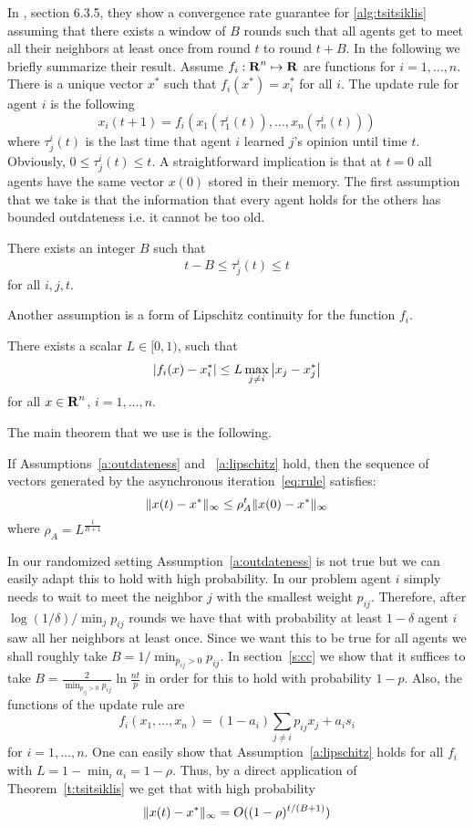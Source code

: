 In \cite{BT97}, section 6.3.5, they show a convergence rate guarantee for
\ref{alg:tsitsiklis} assuming that there exists
a window of $B$ rounds such that all agents get to meet all their
neighbors at least once from round $t$ to round $t+B$.
In the  following we briefly summarize their result. 
Assume $f_i:\bm{\mathrm{R}}^n \mapsto \bm{\mathrm{R}}$ are functions for $i = 1,\ldots,n$. There is 
a unique vector $x^*$ such that $f_i(x^*) = x_i^*$ for all $i$. 
The update rule for agent $i$ is the following
\begin{equation}\label{eq:rule}
x_i(t+1) = f_i(x_1(\tau_1^i(t)),\ldots, x_n(\tau_n^i(t)))
\end{equation}
where $\tau_j^i(t)$ is the last time that agent $i$
learned $j$'s opinion until time $t$. Obviously, $0\leq \tau_j^i(t) \leq t$.
A straightforward implication is that at $t =0$ all agents have the same 
vector $x(0)$ stored in their memory. 
The first assumption that we take is that the information that every agent
holds for the others has bounded outdateness i.e. it cannot be too old. 
\begin{assumption}\label{a:outdateness}
There exists an integer $B$ such that 
\[
t-B \leq \tau_j^i(t) \leq t
\]
for all $i,j,t$.
\end{assumption}
Another assumption is a form of Lipschitz continuity for the function $f_i$.
\begin{assumption}\label{a:lipschitz}
There exists a scalar $L \in [0,1)$, such that 
\[
\left|f_i(x) - x_i^*\right| \leq L \max_{j \neq i}\left|x_j - x_j^*\right|
\]
for all $x \in \bm{\mathrm{R}}^n$, $i = 1,\ldots, n$.
\end{assumption}
The main theorem that we use is the following. 
\begin{theorem}[{{\cite{BT97}}}]\label{t:tsitsiklis}
If Assumptions~\ref{a:outdateness} and ~\ref{a:lipschitz} hold, 
then the sequence of vectors generated 
by the asynchronous iteration~\ref{eq:rule} satisfies:
\[
\| x(t) - x^* \|_{\infty} \leq \rho_A^t\| x(0) - x^* \|_{\infty}
\]
where $\rho_A = L^{\frac{1}{B+1}}$
\end{theorem}
In our randomized setting Assumption~\ref{a:outdateness} is not true 
but we can easily adapt this to
hold with high probability. In our problem
agent $i$ simply needs to wait to meet the neighbor $j$ with the smallest
weight $p_{ij}$. Therefore, after $\log(1/\delta)/\min_{j} p_{ij}$ rounds
we have that with probability at least $1-\delta$ agent $i$ saw all her
neighbors at least once. Since we want this to be true for all agents
we shall roughly take $B = 1/\min_{p_{ij} > 0} {p_{ij}}$.
In section~\ref{s:cc} we show that it suffices to take 
$B = \frac{2}{\min_{p_{ij} > 0} {p_{ij}}}\ln\frac{nt}{p}$
in order for this to hold with probability $1-p$.
Also, the functions of the update rule are
\[
f_i(x_1,\ldots,x_n) = (1-a_i)\sum_{j \neq i} p_{ij} x_j + a_i s_i
\] 
for $i = 1,\ldots,n$.
One can easily show that Assumption~\ref{a:lipschitz} holds for all $f_i$
with $L = 1 - \min_i a_i = 1 - \rho$. 
Thus, by a direct application of Theorem~\ref{t:tsitsiklis} 
we get that with high probability
\[
  \| x(t) - x^* \|_{\infty} = O((1-\rho)^{t/(B+1)})
\]

